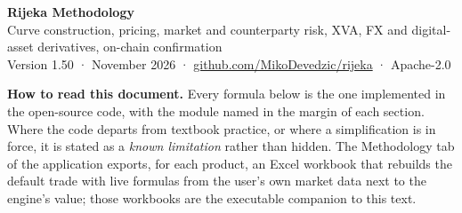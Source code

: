 \documentclass[11pt,a4paper]{article}
\begin{document}
\begin{center}
{\LARGE\bfseries Rijeka Methodology}\\[4pt]
{\large Curve construction, pricing, market and counterparty risk, XVA, FX and digital-asset derivatives, on-chain confirmation}\\[6pt]
{\color{dim} Version 1.50 · November 2026 · \href{https://github.com/MikoDevedzic/rijeka}{github.com/MikoDevedzic/rijeka} · Apache-2.0}
\end{center}

\vspace{4pt}
\noindent\textbf{How to read this document.} Every formula below is the one implemented in the open-source code, with the module named in the margin of each section. Where the code departs from textbook practice, or where a simplification is in force, it is stated as a \emph{known limitation} rather than hidden. The Methodology tab of the application exports, for each product, an Excel workbook that rebuilds the default trade with live formulas from the user's own market data next to the engine's value; those workbooks are the executable companion to this text.

\tableofcontents
\end{document}
